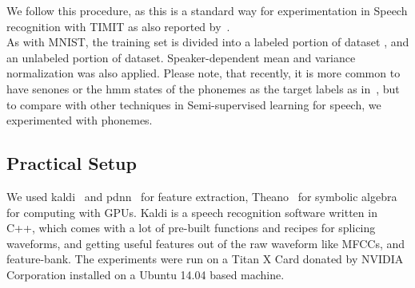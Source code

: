 We follow this procedure, as this is a standard way for experimentation in Speech recognition with TIMIT as also reported by~\cite{liu-2013}.  \\
As with MNIST, the training set is divided into a labeled portion of dataset , and an unlabeled portion of dataset. 
Speaker-dependent mean and variance normalization was also applied. Please note, that recently, it is more common to have senones or the hmm states of the phonemes as the target labels as in~\cite{mohamed-2009}, but to compare with other techniques in Semi-supervised learning for speech, we experimented with phonemes.

\subsection{Practical Setup}
We used kaldi~\cite{kaldi} and pdnn~\cite{pdnn} for feature extraction, Theano~\cite{theano} for symbolic algebra for computing with GPUs. Kaldi is a speech recognition software written in C++, which comes with a lot of pre-built functions and recipes for splicing waveforms, and getting useful features out of the raw waveform like MFCCs, and feature-bank. The experiments were run on a Titan X Card donated by NVIDIA Corporation installed on a Ubuntu 14.04 based machine.


